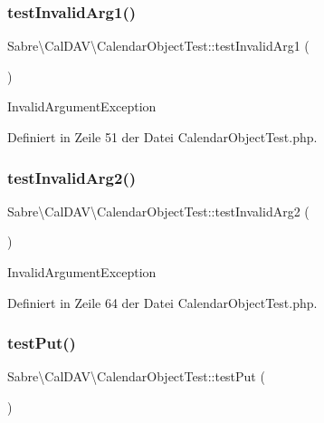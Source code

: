 \subsubsection{\texorpdfstring{test\+Invalid\+Arg1()}{testInvalidArg1()}}
{\footnotesize\ttfamily Sabre\textbackslash{}\+Cal\+D\+A\+V\textbackslash{}\+Calendar\+Object\+Test\+::test\+Invalid\+Arg1 (\begin{DoxyParamCaption}{ }\end{DoxyParamCaption})}

Invalid\+Argument\+Exception 

Definiert in Zeile 51 der Datei Calendar\+Object\+Test.\+php.

\mbox{\label{class_sabre_1_1_cal_d_a_v_1_1_calendar_object_test_a02100e6e53fcbce5d7f30675d0d01b12}} 
\subsubsection{\texorpdfstring{test\+Invalid\+Arg2()}{testInvalidArg2()}}
{\footnotesize\ttfamily Sabre\textbackslash{}\+Cal\+D\+A\+V\textbackslash{}\+Calendar\+Object\+Test\+::test\+Invalid\+Arg2 (\begin{DoxyParamCaption}{ }\end{DoxyParamCaption})}

Invalid\+Argument\+Exception 

Definiert in Zeile 64 der Datei Calendar\+Object\+Test.\+php.

\mbox{\label{class_sabre_1_1_cal_d_a_v_1_1_calendar_object_test_ad94cec10fb678b457f029c859b3302da}} 
\subsubsection{\texorpdfstring{test\+Put()}{testPut()}}
{\footnotesize\ttfamily Sabre\textbackslash{}\+Cal\+D\+A\+V\textbackslash{}\+Calendar\+Object\+Test\+::test\+Put (\begin{DoxyParamCaption}{ }\end{DoxyParamCaption})}

